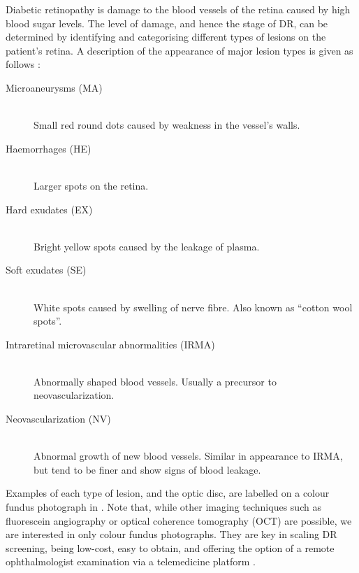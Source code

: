 Diabetic retinopathy is damage to the blood vessels of the retina caused by high blood sugar levels.
The level of damage, and hence the stage of DR, can be determined by identifying and categorising different types of lesions on the patient's retina.
A description of the appearance of major lesion types is given as follows \cite{taylor2012handbook}:
\begin{description}
    \item[Microaneurysms (MA)] \hfill \\ Small red round dots caused by weakness in the vessel's walls.
    \item[Haemorrhages (HE)] \hfill \\ Larger spots on the retina.
    \item[Hard exudates (EX)] \hfill \\ Bright yellow spots caused by the leakage of plasma.
    \item[Soft exudates (SE)] \hfill \\ White spots caused by swelling of nerve fibre. Also known as ``cotton wool spots''.
    \item[Intraretinal microvascular abnormalities (IRMA)] \hfill \\ Abnormally shaped blood vessels. Usually a precursor to neovascularization.
    \item[Neovascularization (NV)] \hfill \\ Abnormal growth of new blood vessels. Similar in appearance to IRMA, but tend to be finer and show signs of blood leakage.
\end{description}
Examples of each type of lesion, and the optic disc, are labelled on a colour fundus photograph in .
Note that, while other imaging techniques such as fluorescein angiography or optical coherence tomography (OCT) are possible, we are interested in only colour fundus photographs. 
They are key in scaling DR screening, being low-cost, easy to obtain, and offering the option of a remote ophthalmologist examination via a telemedicine platform \cite{pmid25949070}.

